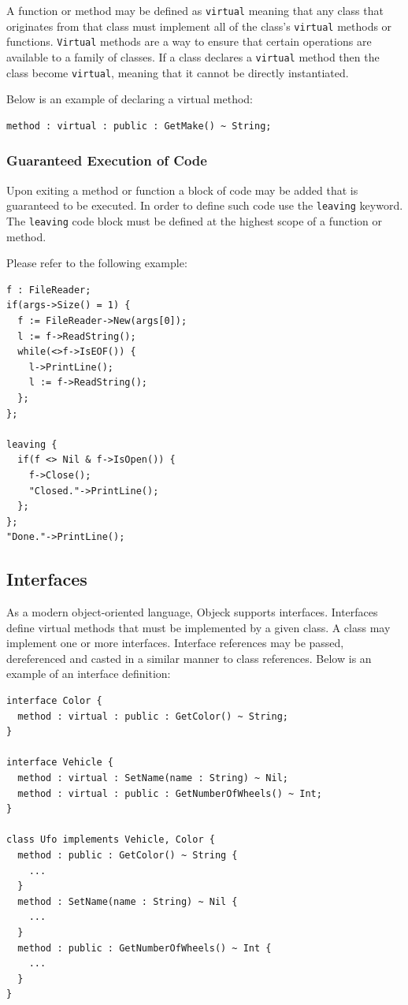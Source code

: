 \documentclass[11pt]{article}
\begin{document}
A function or method may be defined as \texttt{virtual} meaning that
any class that originates from that class must implement all of the
class's \texttt{virtual} methods or functions.  \texttt{Virtual}
methods are a way to ensure that certain operations are available to a
family of classes. If a class declares a \texttt{virtual} method then
the class become \texttt{virtual}, meaning that it cannot be directly
instantiated.

Below is an example of declaring a virtual method:
\begin{verbatim}
method : virtual : public : GetMake() ~ String;
\end{verbatim}

\subsubsection{Guaranteed Execution of Code}
Upon exiting a method or function a block of code may be added that is 
guaranteed to be executed. In order to define such code use the 
\texttt{leaving} keyword. The \texttt{leaving} code block must be 
defined at the highest scope of a function or method.

Please refer to the following example:
\begin{verbatim}
f : FileReader;
if(args->Size() = 1) {
  f := FileReader->New(args[0]);
  l := f->ReadString();
  while(<>f->IsEOF()) {
    l->PrintLine();
    l := f->ReadString();
  };
};

leaving {
  if(f <> Nil & f->IsOpen()) {
    f->Close();
    "Closed."->PrintLine();
  };
};
"Done."->PrintLine();
\end{verbatim}

\subsection{Interfaces}
As a modern object-oriented language, Objeck supports interfaces.
Interfaces define virtual methods that must be implemented by a given
class.  A class may implement one or more interfaces.  Interface
references may be passed, dereferenced and casted in a similar manner
to class references.  Below is an example of an interface definition:

\begin{verbatim}
interface Color {
  method : virtual : public : GetColor() ~ String;
}

interface Vehicle {
  method : virtual : SetName(name : String) ~ Nil;
  method : virtual : public : GetNumberOfWheels() ~ Int;
}

class Ufo implements Vehicle, Color {
  method : public : GetColor() ~ String {
    ...
  }
  method : SetName(name : String) ~ Nil {
    ...
  }
  method : public : GetNumberOfWheels() ~ Int {
    ...
  }
}
\end{verbatim}
\end{document}
